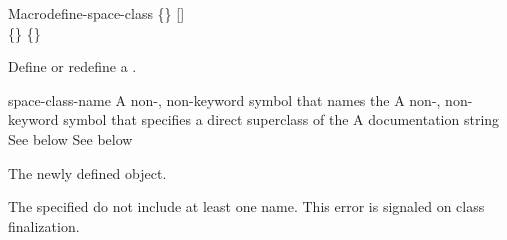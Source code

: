 \documentclass[10pt,twoside,english,pdftex]{article}
\begin{document}
\begin{functiondoc}{Macro}{define-space-class}%
   { 
   \code{(}\{\}\superstar\code{)}
   [] \\
   \code{(}\{\}\superstar\code{)}
   \{\}\superstar{} \returns{}
   }
%
%
%

\fnsyntax

\fnpurpose Define or redefine a .

\fnpackage {}

\fnmodule {}

\fnargs
\begin{args}{space-class-name}
 A non-\nil, non-keyword symbol that names the
 A non-\nil, non-keyword symbol that specifies a
direct superclass of the    
\arg[documentation] A documentation string
 See below
 See below
\end{args}

\fnreturns The newly defined  object.

\fnerrors The specified  do not include at least
one  name.  This error is signaled on class finalization.


\end{functiondoc}
\end{document}
